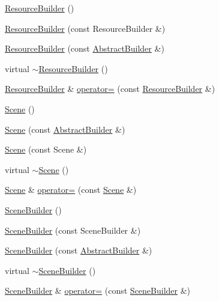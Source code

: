 \begin{DoxyCompactItemize}
\item 
\hyperlink{namespacejli_ae9f9f7477ddfe0b9d4ac195927e749b4}{Resource\+Builder} ()
\item 
\hyperlink{namespacejli_ac25c61dfb7fd3cd0172ccf6a5d6d9598}{Resource\+Builder} (const Resource\+Builder \&)
\item 
\hyperlink{namespacejli_a2f0f2d3abddab36a2e632d5fe25bdea7}{Resource\+Builder} (const \hyperlink{classjli_1_1_abstract_builder}{Abstract\+Builder} \&)
\item 
virtual \hyperlink{namespacejli_a7e46cbc7bc71f3c538261e41816e87b0}{$\sim$\+Resource\+Builder} ()
\item 
\hyperlink{namespacejli_ae9f9f7477ddfe0b9d4ac195927e749b4}{Resource\+Builder} \& \hyperlink{namespacejli_a544c167a86203fa931b358dc2e77df53}{operator=} (const \hyperlink{namespacejli_ae9f9f7477ddfe0b9d4ac195927e749b4}{Resource\+Builder} \&)
\item 
\hyperlink{namespacejli_abef8701bc66efaecdfb9b759f7523e9d}{Scene} ()
\item 
\hyperlink{namespacejli_afbad74f1983633db64663db362041720}{Scene} (const \hyperlink{classjli_1_1_abstract_builder}{Abstract\+Builder} \&)
\item 
\hyperlink{namespacejli_a4e0a2f2e6f43f3cf5e866f662dfa011a}{Scene} (const Scene \&)
\item 
virtual \hyperlink{namespacejli_a59998f54275bafbf74434f6954f9cd2e}{$\sim$\+Scene} ()
\item 
\hyperlink{namespacejli_abef8701bc66efaecdfb9b759f7523e9d}{Scene} \& \hyperlink{namespacejli_a87277a99c7a713dc593e70bbab6bf0f8}{operator=} (const \hyperlink{namespacejli_abef8701bc66efaecdfb9b759f7523e9d}{Scene} \&)
\item 
\hyperlink{namespacejli_a416f25c3329cd3e760e1a184b62e7223}{Scene\+Builder} ()
\item 
\hyperlink{namespacejli_a08327fcbf8005b89aa48e20217b34adc}{Scene\+Builder} (const Scene\+Builder \&)
\item 
\hyperlink{namespacejli_a2f38a2d72a581791a6deeebca04d5daf}{Scene\+Builder} (const \hyperlink{classjli_1_1_abstract_builder}{Abstract\+Builder} \&)
\item 
virtual \hyperlink{namespacejli_a99a07c08fdc61e92c99f5a47bc3430fa}{$\sim$\+Scene\+Builder} ()
\item 
\hyperlink{namespacejli_a416f25c3329cd3e760e1a184b62e7223}{Scene\+Builder} \& \hyperlink{namespacejli_ab76ae2c8b17665d1e78209f9c76653e8}{operator=} (const \hyperlink{namespacejli_a416f25c3329cd3e760e1a184b62e7223}{Scene\+Builder} \&)

\end{DoxyCompactItemize}
